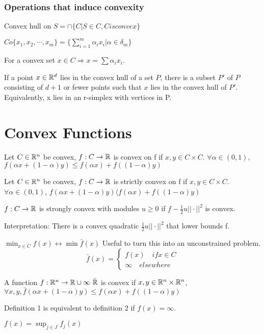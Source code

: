 \subsubsection{Operations that induce convexity}
Convex hull on $S = \cap \{C | S\in C, C is convex\}$\\
\begin{example}
$Co \{ x_1,x_2,\cdots,x_m\} = \{ \sum_{i=1}^m \alpha_i x_i | \alpha \in \delta_m \}$
\end{example}
For a convex set $x \in C \Rightarrow x = \sum \alpha_i x_i$. 
\begin{theorem}
If a point $x \in \mathbb{R}^d$ lies in the convex hull of a set $P$, there is a subset $P'$ of $P$ consisting of $d + 1$ or fewer points such that $x$ lies in the convex hull of $P'$. Equivalently, x lies in an r-simplex with vertices in P.
\end{theorem}

\section{Convex Functions}
\begin{definition}
Let $C \in \mathbb{R}^n$ be convex, $f:C \to \mathbb{R}$ is convex on f if $x,y \in C \times C$. $\forall \alpha \in (0,1)$, $f(\alpha x + (1-\alpha) y) \le f(\alpha x) + f((1-\alpha) y)$
\end{definition}

\begin{definition}
Let $C \in \mathbb{R}^n$ be convex, $f:C \to \mathbb{R}$ is strictly convex on f if $x,y \in C \times C$. $\forall \alpha \in (0,1)$, $f(\alpha x + (1-\alpha) y) \langle f(\alpha x) + f((1-\alpha) y)$
\end{definition}

\begin{definition}
$f:C \to \mathbb{R}$ is strongly convex with modules $u \ge 0$ if $f - \frac{1}{2}u || \cdot ||^2$ is convex.
\end{definition}
Interpretation: There is a convex quadratic $\frac{1}{2}u || \cdot ||^2$ that lower bounds f.
\begin{example}
$\min_{x \in C} f(x) \leftrightarrow \min \bar{f}(x)$
Useful to turn this into an unconstrained problem. \\
$$\bar{f}(x) = \begin{cases}
f(x) \quad if x \in C \\
\infty \quad  elsewhere
\end{cases}$$
\end{example}
\begin{definition}
A function $f : \R^n \to \R \cup \infty \ \bar{\R}$ is convex if $x,y \in \mathbb{R}^n \times \mathbb{R}^n$, $\forall x,y , \bar{f}(\alpha x + (1-\alpha) y) \le f(\alpha x) + f((1-\alpha) y)$
\end{definition}
Definition 1 is equivalent to definition 2 if $f(x) = \infty$.
\begin{example}
$f(x) = \sup_{j \in J} f_j(x)$
\end{example}

